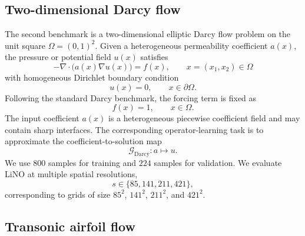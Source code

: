 \documentclass{article}
\begin{document}
\subsection{Two-dimensional Darcy flow}
\label{app:darcy}

The second benchmark is a two-dimensional elliptic Darcy flow problem on the unit square
$\Omega=(0,1)^2$. 
Given a heterogeneous permeability coefficient $a(x)$, the pressure or potential field $u(x)$ satisfies
\begin{equation}
    -\nabla\cdot\big(a(x)\nabla u(x)\big)=f(x),
    \qquad x = (x_1, x_2) \in\Omega
    \label{eq:app-darcy}
\end{equation}
with homogeneous Dirichlet boundary condition
\begin{equation}
    u(x)=0,
    \qquad x\in\partial\Omega.
    \label{eq:app-darcy-bc}
\end{equation}
Following the standard Darcy benchmark, the forcing term is fixed as
\begin{equation}
    f(x)=1,
    \qquad x\in\Omega.
    \label{eq:app-darcy-forcing}
\end{equation}
The input coefficient $a(x)$ is a heterogeneous piecewise coefficient field and may contain sharp interfaces. 
The corresponding operator-learning task is to approximate the coefficient-to-solution map
\begin{equation}
    \mathcal{G}_{\mathrm{Darcy}}:
    a \mapsto u.
    \label{eq:app-darcy-map}
\end{equation}
We use $800$ samples for training and $224$ samples for validation. 
We evaluate LiNO at multiple spatial resolutions,
\begin{equation}
    s\in\{85,141,211,421\},
    \label{eq:app-darcy-resolutions}
\end{equation}
corresponding to grids of size $85^2$, $141^2$, $211^2$, and $421^2$. 

\subsection{Transonic airfoil flow}
\label{app:airfoil}
\end{document}
